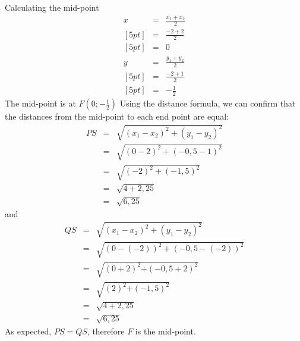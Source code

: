 \begin{wex}{Calculating the mid-point}
{
\begin{eqnarray*}
x & = & \frac{{x}_{1} + {x}_{2}}{2} \\ [5pt]
& = & \frac{-2 + 2}{2} \\ [5pt]
& = & 0 \\ 
y & = & \frac{{y}_{1} + {y}_{2}}{2} \\ [5pt]
& = & \frac{-2 + 1}{2} \\ [5pt]
& = & -\frac{1}{2} 
\end{eqnarray*}
The mid-point is at $F(0;-\frac{1}{2})$
Using the distance formula, we can confirm that the distances from the mid-point to each end point are equal: 
\begin{eqnarray*}
PS & = & \sqrt{{({x}_{1} - {x}_{2})}^{2} + {({y}_{1} - {y}_{2})}^{2}} \\ 
& = & \sqrt{{(0 - 2)}^{2} + {(-0,5 - 1)}^{2}} \\ 
& = & \sqrt{{(-2)}^{2} + {(-1,5)}^{2}} \\ 
& = & \sqrt{4 + 2,25} \\ 
& = & \sqrt{6,25}
\end{eqnarray*}
and
\begin{eqnarray*}
QS & = & \sqrt{{({x}_{1} - {x}_{2})}^{2} + {({y}_{1} - {y}_{2})}^{2}} \\ 
& = & \sqrt{{(0 - (-2))}^{2} + {(-0,5 - (-2))}^{2}} \\ 
& = & \sqrt{{(0 + 2)}^{2}{+(-0,5 + 2)}^{2}} \\ 
& = & \sqrt{{(2)}^{2}{+(-1,5)}^{2}} \\ 
& = & \sqrt{4 + 2,25} \\ 
& = & \sqrt{6,25}
\end{eqnarray*}
As expected, $PS=QS$, therefore $F$ is the mid-point. 
}
\end{wex}




